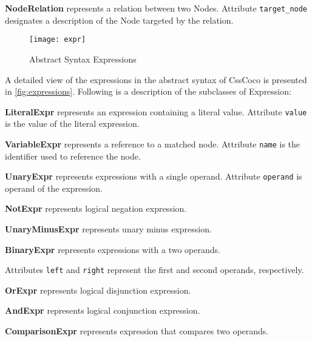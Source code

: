 \begin{description}
\item\textbf{NodeRelation} represents a relation between two Nodes. Attribute \texttt{target\_node}
designates a description of the Node targeted by the relation.

\end{description}


\begin{figure}[h]
  \centering
  \caption{Abstract Syntax Expressions}
  \label{fig:expressions}
  \texttt{[image: expr]}
\end{figure}

A detailed view of the expressions in the abstract syntax of CssCoco is presented in \autoref{fig:expressions}. Following is a description of the subclasses of Expression:

\begin{description}

\item\textbf{LiteralExpr} represents an expression containing a literal value. Attribute \texttt{value} is the value of the literal expression.

\item\textbf{VariableExpr} represents a reference to a matched node. Attribute \texttt{name} is the identifier used to reference the node.

\item\textbf{UnaryExpr} represents expressions with a single operand. Attribute \texttt{operand} is operand of the expression.

\item\textbf{NotExpr} represents logical negation expression.

\item\textbf{UnaryMinusExpr} represents unary minus expression.

\item\textbf{BinaryExpr} represents expressions with a two operands.

Attributes \texttt{left} and \texttt{right} represent the first and second operands, respectively.

\item\textbf{OrExpr} represents logical disjunction expression.

\item\textbf{AndExpr} represents logical conjunction expression.

\item\textbf{ComparisonExpr} represents expression that compares two operands.


\end{description}
